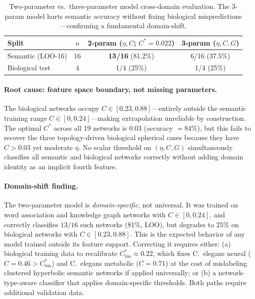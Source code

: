 \documentclass[11pt,a4paper]{article}
\newcommand{\Cstar}{C^*}
\begin{document}
\begin{table}[h]
\centering
\small
\caption{Two-parameter vs.\ three-parameter model cross-domain evaluation. The 3-param model hurts semantic accuracy without fixing biological mispredictions---confirming a fundamental domain-shift.}
\label{tab:revised_model}
\begin{tabular}{@{}lccc@{}}
\toprule
Split & $n$ & 2-param ($\eta,C$; $\Cstar=0.022$) & 3-param ($\eta,C,G$) \\
\midrule
Semantic (LOO-16) & 16 & \textbf{13/16} (81.2\%) & 6/16 (37.5\%) \\
Biological test   & 4  & 1/4   (25\%)  & 1/4 (25\%) \\
\bottomrule
\end{tabular}
\end{table}

\paragraph{Root cause: feature space boundary, not missing parameters.}
The biological networks occupy $C \in [0.23, 0.88]$---entirely outside the semantic training range $C \in [0, 0.24]$---making extrapolation unreliable by construction. The optimal $C^*$ across all 19 networks is $0.03$ (accuracy $= 84\%$), but this fails to recover the three topology-driven biological spherical cases because they have $C > 0.03$ yet moderate $\eta$. No scalar threshold on $(\eta{}, C, G)$ simultaneously classifies all semantic and biological networks correctly without adding domain identity as an implicit fourth feature.

\paragraph{Domain-shift finding.}
The two-parameter model is \emph{domain-specific}, not universal. It was trained on word association and knowledge graph networks with $C \in [0, 0.24]$, and correctly classifies $13/16$ such networks (81\%, LOO), but degrades to $25\%$ on biological networks with $C \in [0.23, 0.88]$. This is the expected behavior of any model trained outside its feature support. Correcting it requires either: (a) biological training data to recalibrate $C^*_{\mathrm{bio}} \approx 0.22$, which fixes C.\ elegans neural ($C=0.46 > C^*_{\mathrm{bio}}$) and C.\ elegans metabolic ($C=0.71$) at the cost of mislabeling clustered hyperbolic semantic networks if applied universally; or (b) a network-type-aware classifier that applies domain-specific thresholds. Both paths require additional validation data.
\end{document}
